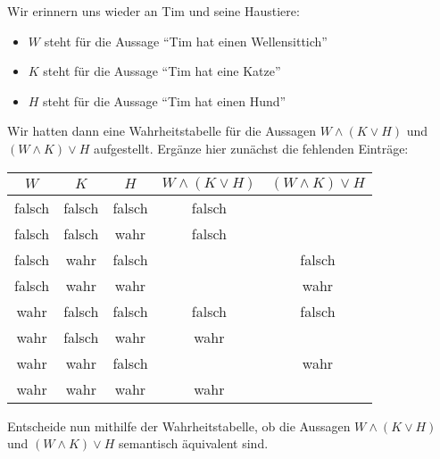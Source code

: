 \documentclass{uebungsblatt}
\begin{document}
\begin{exercise}
    Wir erinnern uns wieder an Tim und seine Haustiere:
    \begin{itemize}
        \item $W$ steht für die Aussage \enquote{Tim hat einen Wellensittich}
        \item $K$ steht für die Aussage \enquote{Tim hat eine Katze}
        \item $H$ steht für die Aussage \enquote{Tim hat einen Hund}
    \end{itemize}

    Wir hatten dann eine Wahrheitstabelle für die Aussagen $W \land (K \lor H)$ und $(W \land K) \lor H$
    aufgestellt. Ergänze hier zunächst die fehlenden Einträge:

    \begin{center}
        \begin{tabular}{ccc cc}\toprule
            $W$ &$K$ & $H$ & $W \land (K \lor H)$ & $(W \land K) \lor H$\\\midrule
            falsch & falsch & falsch & falsch & \\ 
            falsch & falsch & wahr & falsch &  \\
            falsch & wahr & falsch &  & falsch\\
            falsch & wahr & wahr &  & wahr\\
            wahr & falsch & falsch & falsch &  falsch \\
            wahr & falsch & wahr & wahr & \\
            wahr & wahr & falsch &  & wahr\\
            wahr & wahr & wahr & wahr &  \\\bottomrule
        \end{tabular}
    \end{center}

    Entscheide nun mithilfe der Wahrheitstabelle, ob die Aussagen $W \land (K \lor H)$ und $(W \land K) \lor H$ semantisch
    äquivalent sind.

    \begin{answerbox}[1in]
    \end{answerbox}
\end{exercise}

\end{document}
